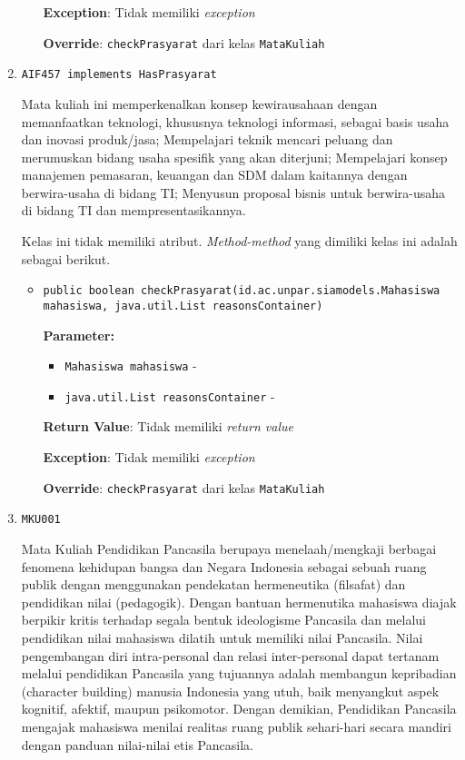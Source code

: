 \documentclass{article}
\begin{document}
\begin{enumerate}
\begin{itemize}
\textbf{Exception}: Tidak memiliki \textit{exception}

\textbf{Override}: \texttt{checkPrasyarat} dari kelas \texttt{MataKuliah}

\end{itemize}
\item \texttt{AIF457 implements HasPrasyarat}

Mata kuliah ini memperkenalkan konsep kewirausahaan dengan memanfaatkan teknologi, khususnya
 teknologi informasi, sebagai basis usaha dan inovasi produk/jasa; Mempelajari
 teknik mencari peluang dan merumuskan bidang usaha spesifik yang akan
 diterjuni; Mempelajari konsep manajemen pemasaran, keuangan dan SDM dalam
 kaitannya dengan berwira-usaha di bidang TI; Menyusun proposal bisnis untuk
 berwira-usaha di bidang TI dan mempresentasikannya.

Kelas ini tidak memiliki atribut. \textit{Method-method} yang dimiliki kelas ini adalah sebagai berikut.
\begin{itemize}
\item \texttt{public boolean checkPrasyarat(id.ac.unpar.siamodels.Mahasiswa mahasiswa, java.util.List reasonsContainer)}



\textbf{Parameter:}
\begin{itemize}
\item \texttt{Mahasiswa mahasiswa} - 
\item \texttt{java.util.List reasonsContainer} - 
\end{itemize}
\textbf{Return Value}: Tidak memiliki \textit{return value}

\textbf{Exception}: Tidak memiliki \textit{exception}

\textbf{Override}: \texttt{checkPrasyarat} dari kelas \texttt{MataKuliah}

\end{itemize}
\item \texttt{MKU001}

Mata Kuliah Pendidikan Pancasila berupaya menelaah/mengkaji berbagai fenomena kehidupan 
 bangsa dan Negara Indonesia sebagai sebuah ruang publik dengan menggunakan pendekatan 
 hermeneutika (filsafat) dan pendidikan nilai (pedagogik). Dengan bantuan hermenutika
 mahasiswa diajak berpikir kritis terhadap segala bentuk ideologisme Pancasila dan melalui 
 pendidikan nilai mahasiswa dilatih untuk memiliki nilai Pancasila. Nilai pengembangan diri 
 intra-personal dan relasi inter-personal dapat tertanam melalui pendidikan Pancasila yang 
 tujuannya adalah membangun kepribadian (character building) manusia Indonesia yang utuh, 
 baik menyangkut aspek kognitif, afektif, maupun psikomotor. Dengan demikian, Pendidikan 
 Pancasila mengajak mahasiswa menilai realitas ruang publik sehari-hari secara mandiri 
 dengan panduan nilai-nilai etis Pancasila.


\end{enumerate}
\end{document}
